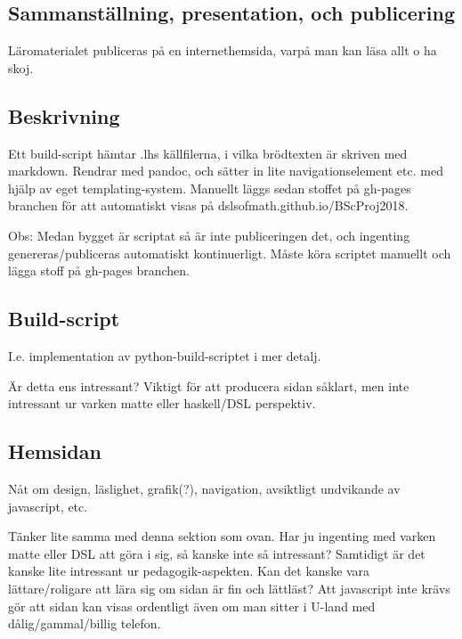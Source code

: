 \begin{binge}
  \section{Sammanställning, presentation, och publicering}

  Läromaterialet publiceras på en internethemsida, varpå man kan läsa
  allt o ha skoj.

  \subsection{Beskrivning}

  Ett build-script hämtar .lhs källfilerna, i vilka brödtexten är
  skriven med markdown. Rendrar med pandoc, och sätter in lite
  navigationselement etc. med hjälp av eget templating-system. Manuellt
  läggs sedan stoffet på gh-pages branchen för att automatiskt visas på
  dslsofmath.github.io/BScProj2018.

  Obs: Medan bygget är scriptat så är inte publiceringen det, och
  ingenting genereras/publiceras automatiskt kontinuerligt. Måste köra
  scriptet manuellt och lägga stoff på gh-pages branchen.

  \subsection{Build-script}

  I.e. implementation av python-build-scriptet i mer detalj.

  Är detta ens intressant? Viktigt för att producera sidan såklart, men
  inte intressant ur varken matte eller haskell/DSL perspektiv.

  \subsection{Hemsidan}

  Nåt om design, läslighet, grafik(?), navigation, avsiktligt undvikande
  av javascript, etc.

  Tänker lite samma med denna sektion som ovan. Har ju ingenting med
  varken matte eller DSL att göra i sig, så kanske inte så intressant?
  Samtidigt är det kanske lite intressant ur pedagogik-aspekten. Kan det
  kanske vara lättare/roligare att lära sig om sidan är fin och
  lättläst? Att javascript inte krävs gör att sidan kan visas ordentligt
  även om man sitter i U-land med dålig/gammal/billig telefon.
\end{binge}

